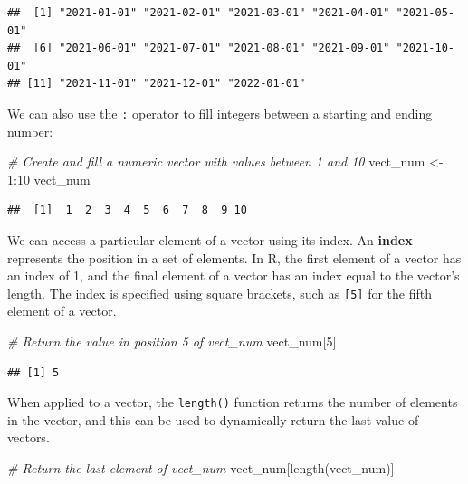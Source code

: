 \documentclass[
]{book}
\newenvironment{Shaded}{\begin{snugshade}}{\end{snugshade}}
\newcommand{\CommentTok}[1]{\textcolor[rgb]{0.56,0.35,0.01}{\textit{#1}}}
\newcommand{\DecValTok}[1]{\textcolor[rgb]{0.00,0.00,0.81}{#1}}
\newcommand{\FunctionTok}[1]{\textcolor[rgb]{0.00,0.00,0.00}{#1}}
\newcommand{\NormalTok}[1]{#1}
\newcommand{\OtherTok}[1]{\textcolor[rgb]{0.56,0.35,0.01}{#1}}
\newcommand{\SpecialCharTok}[1]{\textcolor[rgb]{0.00,0.00,0.00}{#1}}
\begin{document}
\begin{verbatim}
##  [1] "2021-01-01" "2021-02-01" "2021-03-01" "2021-04-01" "2021-05-01"
##  [6] "2021-06-01" "2021-07-01" "2021-08-01" "2021-09-01" "2021-10-01"
## [11] "2021-11-01" "2021-12-01" "2022-01-01"
\end{verbatim}

We can also use the \texttt{:} operator to fill integers between a starting and ending number:

\begin{Shaded}
\begin{Highlighting}[]
\CommentTok{\# Create and fill a numeric vector with values between 1 and 10}
\NormalTok{vect\_num }\OtherTok{\textless{}{-}} \DecValTok{1}\SpecialCharTok{:}\DecValTok{10}
\NormalTok{vect\_num}
\end{Highlighting}
\end{Shaded}

\begin{verbatim}
##  [1]  1  2  3  4  5  6  7  8  9 10
\end{verbatim}

We can access a particular element of a vector using its index. An \textbf{index} represents the position in a set of elements. In R, the first element of a vector has an index of 1, and the final element of a vector has an index equal to the vector's length. The index is specified using square brackets, such as \texttt{{[}5{]}} for the fifth element of a vector.

\begin{Shaded}
\begin{Highlighting}[]
\CommentTok{\# Return the value in position 5 of vect\_num}
\NormalTok{vect\_num[}\DecValTok{5}\NormalTok{]}
\end{Highlighting}
\end{Shaded}

\begin{verbatim}
## [1] 5
\end{verbatim}

When applied to a vector, the \texttt{length()} function returns the number of elements in the vector, and this can be used to dynamically return the last value of vectors.

\begin{Shaded}
\begin{Highlighting}[]
\CommentTok{\# Return the last element of vect\_num}
\NormalTok{vect\_num[}\FunctionTok{length}\NormalTok{(vect\_num)]}
\end{Highlighting}
\end{Shaded}
\end{document}
